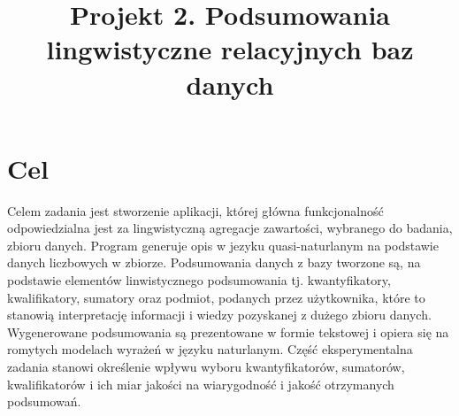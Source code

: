 \documentclass{classrep}
\author{
  \studentinfo{Daria Rogowska}{229989} \and
  \studentinfo{Mateusz Srebnik}{230004} }
\title{Projekt 2.  Podsumowania lingwistyczne relacyjnych baz danych}
\begin{document}
\maketitle


\section{Cel}

Celem zadania jest stworzenie aplikacji, której główna funkcjonalność odpowiedzialna jest za lingwistyczną agregacje zawartości, wybranego do badania, zbioru danych\cite{database}. 
Program generuje opis w jezyku quasi-naturlanym na podstawie danych liczbowych w zbiorze. 
Podsumowania danych z bazy tworzone są, na podstawie elementów linwistycznego podsumowania tj. kwantyfikatory, kwalifikatory, sumatory oraz podmiot, podanych przez użytkownika, które to stanowią interpretację informacji i wiedzy pozyskanej z dużego zbioru danych.
Wygenerowane podsumowania są prezentowane w formie tekstowej i opiera się na romytych modelach wyrażeń w języku naturlanym.
Część eksperymentalna zadania stanowi określenie 
wpływu wyboru kwantyfikatorów, sumatorów, kwalifikatorów i ich miar jakości na wiarygodność i jakość otrzymanych podsumowań. 


\end{document}
